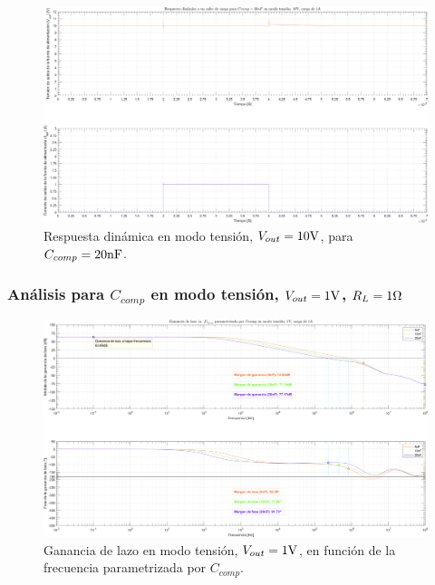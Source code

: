 \clearpage

\begin{figure}[H] %
\begin{center}
\includegraphics[width=1.1 \textwidth, angle=90]{./img/plots/dynamic/power_supply_CCOMP_20n_STEP_Modo1.png}
\caption{\label{fig:fig_power_supply_CCOMP_STEP_20n_Modo1}\footnotesize{Respuesta dinámica en modo tensión, $V_{out} = 10 \si[per-mode=symbol]{\volt}$, para $C_{comp} = 20 \si[per-mode=symbol]{\nano\farad} $.}}
\end{center}
\end{figure}

\clearpage


\subsubsection{Análisis para $C_{comp}$ en modo tensión, $V_{out} = 1 \si[per-mode=symbol]{\volt}$, $R_{L} = 1 \si[per-mode=symbol]{\ohm}$}

\clearpage

\begin{figure}[H] %
\begin{center}
\includegraphics[width=1.1 \textwidth, angle=90]{./img/plots/loop/power_supply_CCOMP_LOOP_Modo2.png}
\caption{\label{fig:fig_power_supply_CCOMP_LOOP_Modo2}\footnotesize{Ganancia de lazo en modo tensión, $V_{out} = 1 \si[per-mode=symbol]{\volt}$, en función de la frecuencia parametrizada por $C_{comp}$.}}
\end{center}
\end{figure}


